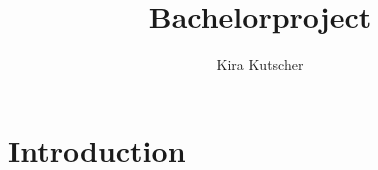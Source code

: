 \documentclass{article}
\title{Bachelorproject}
\author{Kira Kutscher}
\begin{document}
\maketitle

\section{Introduction}
\end{document}
